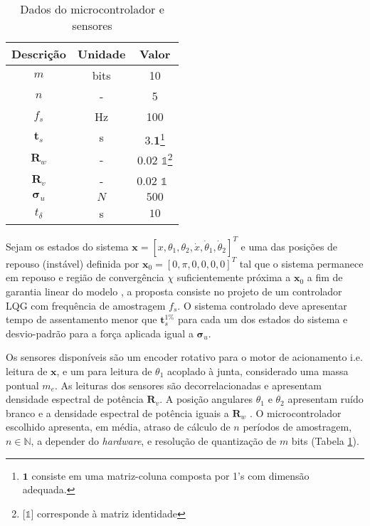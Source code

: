 \documentclass[a4paper, twoside, fleqn]{article}
\begin{document}
\begin{table}[!ht]
\begin{minipage}[b]{0.45\linewidth}
\begin{tabular}{|c|c|c|}
                    \hline Descrição & Unidade & Valor\\ \hline
                    $m$ & bits & 10 \\
                    $n$ & - & 5 \\
                    $f_s$ & Hz & 100 \\
                    $\mathbf{t}_s$ & s & $3.\mathbf{1}$\footnote{$\mathbf{1} $ consiste em uma matriz-coluna composta por 1's com dimensão adequada.} \\
                    $\mathbf{R}_w$ & - & 0.02 $\mathds{1}$\footnote{[$\mathds{1}$] corresponde à matriz identidade}  \\ 
                    $\mathbf{R}_v$ & - & 0.02 $\mathds{1}$ \, \\
                    $\mathbf{\sigma}_u$ & $N$ & $500$ \\
                    $t_{\delta}$ & s & $10$ \\
                    \hline
                \end{tabular}
                \caption{Dados do microcontrolador e sensores}
                \label{tab:dados_controle}
        \end{minipage}
    \end{table}
    
    Sejam os estados do sistema $\mathbf{x} = [x, \theta_1, \theta_2, \dot x, \dot \theta_1, \dot \theta_2]^T$ e uma das posições de repouso (instável) definida por $\mathbf{x}_{0} = [0, \pi, 0, 0, 0, 0]^T$ tal que o sistema permanece em repouso e região de convergência $\chi$ suficientemente próxima a $\mathbf{x}_{0}$ a fim de garantia linear do modelo \cite{Adamy2009}, a proposta consiste no projeto de um controlador LQG com frequência de amostragem $f_s$. O sistema controlado deve apresentar tempo de assentamento menor que $\mathbf{t}_s^{1\%}$ para cada um dos estados do sistema e desvio-padrão para a força aplicada igual a $\mathbf{\sigma}_u$. 
    
    Os sensores disponíveis são um encoder rotativo para o motor de acionamento i.e. leitura de $\mathbf{x}$, e um para leitura de $\theta_1$ acoplado à junta, considerado uma massa pontual $m_e$. As leituras dos sensores são decorrelacionadas e apresentam densidade espectral de potência $\mathbf{R}_v$. A posição angulares $\theta_1$ e $\theta_2$ apresentam ruído branco e a densidade espectral de potência iguais a $\mathbf{R}_w$ \cite{controle_digital_2018}. O microcontrolador escolhido apresenta, em média, atraso de cálculo de $n$ períodos de amostragem, $n \in \mathbb{N}$, a depender do \emph{hardware}, e resolução de quantização de $m$ bits (Tabela \ref{tab:dados_controle}).
    
\end{document}
